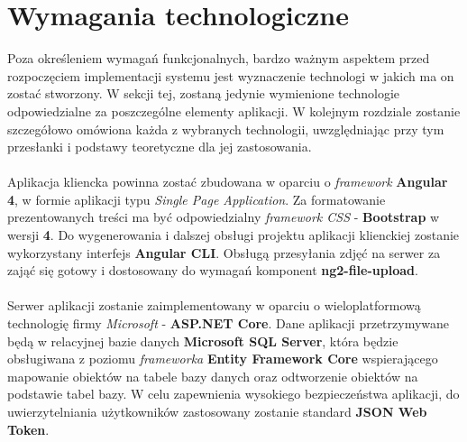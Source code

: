 \section{Wymagania technologiczne}
\quad Poza określeniem wymagań funkcjonalnych, bardzo ważnym aspektem przed rozpoczęciem implementacji systemu jest wyznaczenie technologi w jakich ma on zostać stworzony. W sekcji tej, zostaną jedynie wymienione technologie odpowiedzialne za poszczególne elementy aplikacji. W kolejnym rozdziale zostanie szczegółowo omówiona każda z wybranych technologii, uwzględniając przy tym przesłanki i podstawy teoretyczne dla jej zastosowania.\\
\\
Aplikacja kliencka powinna zostać zbudowana w oparciu o \textit{framework} \textbf{Angular 4}, w formie aplikacji typu \textit{Single Page Application}. Za formatowanie prezentowanych treści ma być odpowiedzialny \textit{framework CSS} - \textbf{Bootstrap} w wersji \textbf{4}. Do wygenerowania i dalszej obsługi projektu aplikacji klienckiej zostanie wykorzystany interfejs \textbf{Angular CLI}. Obsługą przesyłania zdjęć na serwer za zająć się gotowy i dostosowany do wymagań komponent \textbf{ng2-file-upload}.\\
\\
Serwer aplikacji zostanie zaimplementowany w oparciu o wieloplatformową technologię firmy \textit{Microsoft} - \textbf{ASP.NET Core}. Dane aplikacji przetrzymywane będą w relacyjnej bazie danych \textbf{Microsoft SQL Server}, która będzie obsługiwana z poziomu \textit{frameworka} \textbf{Entity Framework Core} wspierającego mapowanie obiektów na tabele bazy danych oraz odtworzenie obiektów na podstawie tabel bazy. W celu zapewnienia wysokiego bezpieczeństwa aplikacji, do uwierzytelniania użytkowników zastosowany zostanie standard \textbf{JSON Web Token}.
